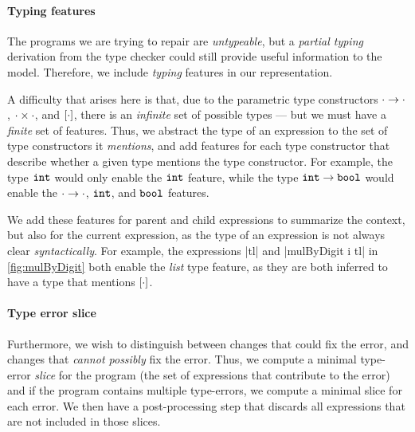 \paragraph{Typing features}
The programs we are trying to repair are \emph{untypeable}, but a \emph{partial
typing} derivation from the type checker could still provide useful information
to the model. Therefore, we include \emph{typing} features in our
representation.

A difficulty that arises here is that, due to the parametric type constructors
$\cdot \to \cdot$, $\cdot \times \cdot$, and $[\cdot]$, there is an
\emph{infinite} set of possible types --- but we must have a \emph{finite} set
of features. Thus, we abstract the type of an expression to the set of type
constructors it \emph{mentions}, and add features for each type constructor that
describe whether a given type mentions the type constructor. For example, the
type $\mathtt{int}$ would only enable the $\mathtt{int}$ feature, while the type
$\mathtt{int} \to \mathtt{bool}$ would enable the $\cdot \to \cdot$, $\mathtt{int}$, and
$\mathtt{bool}$ features.

We add these features for parent and child expressions to summarize the context,
but also for the current expression, as the type of an expression is not always
clear \emph{syntactically}. For example, the expressions |tl| and
|mulByDigit i tl| in \autoref{fig:mulByDigit} both enable the \emph{list} type
feature, as they are both inferred to have a type that mentions $[\cdot]$.


\paragraph{Type error slice}
Furthermore, we wish to distinguish between changes that could fix the error,
and changes that \emph{cannot possibly} fix the error. Thus, we compute a
minimal type-error \emph{slice} for the program (\ie the set of expressions that
contribute to the error) and if the program contains multiple type-errors, we
compute a minimal slice for each error. We then have a post-processing step that
discards all expressions that are not included in those slices.


